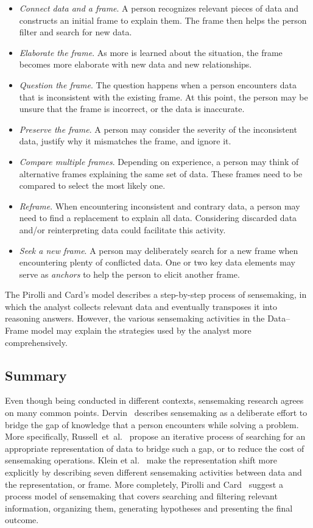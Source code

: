 \begin{itemize}
	\item \emph{Connect data and a frame}. A person recognizes relevant pieces of data and constructs an initial frame to explain them. The frame then helps the person filter and search for new data.
	\item \emph{Elaborate the frame}. As more is learned about the situation, the frame becomes more elaborate with new data and new relationships.
	\item \emph{Question the frame}. The question happens when a person encounters data that is inconsistent with the existing frame. At this point, the person may be unsure that the frame is incorrect, or the data is inaccurate.
	\item \emph{Preserve the frame}. A person may consider the severity of the inconsistent data, justify why it mismatches the frame, and ignore it.
	\item \emph{Compare multiple frames}. Depending on experience, a person may think of alternative frames explaining the same set of data. These frames need to be compared to select the most likely one.
	\item \emph{Reframe}. When encountering inconsistent and contrary data, a person may need to find a replacement to explain all data. Considering discarded data and/or reinterpreting data could facilitate this activity.
	\item \emph{Seek a new frame}. A person may deliberately search for a new frame when encountering plenty of conflicted data. One or two key data elements may serve as \emph{anchors} to help the person to elicit another frame.
\end{itemize}

The Pirolli and Card's model describes a step-by-step process of sensemaking, in which the analyst collects relevant data and eventually transposes it into reasoning answers. However, the various sensemaking activities in the Data--Frame model may explain the strategies used by the analyst more comprehensively.

\subsection{Summary}
Even though being conducted in different contexts, sensemaking research agrees on many common points. Dervin~\cite{Dervin1983} describes sensemaking as a deliberate effort to bridge the gap of knowledge that a person encounters while solving a problem. More specifically, Russell~et~al.~\cite{Russell1993} propose an iterative process of searching for an appropriate representation of data to bridge such a gap, or to reduce the cost of sensemaking operations. Klein et al.~\cite{Klein2003} make the representation shift more explicitly by describing seven different sensemaking activities between data and the representation, or frame. More completely, Pirolli and Card~\cite{Pirolli2005} suggest a process model of sensemaking that covers searching and filtering relevant information, organizing them, generating hypotheses and presenting the final outcome.

